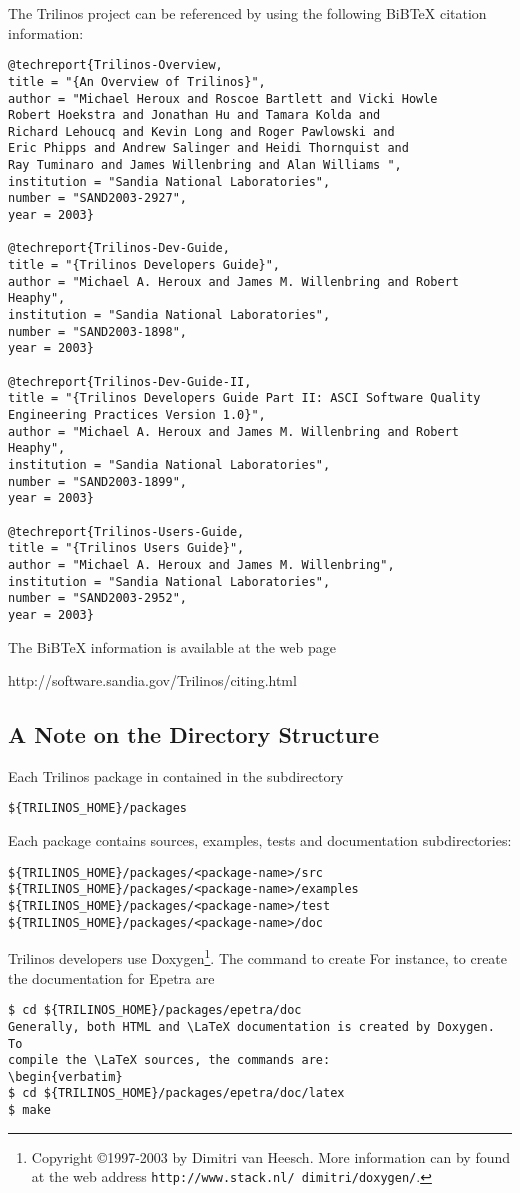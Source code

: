The Trilinos project can be referenced by using the following BiBTeX
citation information:
\begin{verbatim}
@techreport{Trilinos-Overview,
title = "{An Overview of Trilinos}",
author = "Michael Heroux and Roscoe Bartlett and Vicki Howle
Robert Hoekstra and Jonathan Hu and Tamara Kolda and
Richard Lehoucq and Kevin Long and Roger Pawlowski and
Eric Phipps and Andrew Salinger and Heidi Thornquist and
Ray Tuminaro and James Willenbring and Alan Williams ",
institution = "Sandia National Laboratories",
number = "SAND2003-2927",
year = 2003}

@techreport{Trilinos-Dev-Guide,
title = "{Trilinos Developers Guide}",
author = "Michael A. Heroux and James M. Willenbring and Robert Heaphy",
institution = "Sandia National Laboratories",
number = "SAND2003-1898",
year = 2003}

@techreport{Trilinos-Dev-Guide-II,
title = "{Trilinos Developers Guide Part II: ASCI Software Quality
Engineering Practices Version 1.0}",
author = "Michael A. Heroux and James M. Willenbring and Robert Heaphy",
institution = "Sandia National Laboratories",
number = "SAND2003-1899",
year = 2003}

@techreport{Trilinos-Users-Guide,
title = "{Trilinos Users Guide}",
author = "Michael A. Heroux and James M. Willenbring",
institution = "Sandia National Laboratories",
number = "SAND2003-2952",
year = 2003}
\end{verbatim}
The BiBTeX information is available at the web page
\begin{verb}
http://software.sandia.gov/Trilinos/citing.html
\end{verb}


\subsection{A Note on the Directory Structure}
\label{sec:into_note}

Each Trilinos package in contained in the subdirectory
\begin{verbatim}
${TRILINOS_HOME}/packages
\end{verbatim}
Each package contains sources, examples, tests and documentation subdirectories:
\begin{verbatim}
${TRILINOS_HOME}/packages/<package-name>/src
${TRILINOS_HOME}/packages/<package-name>/examples
${TRILINOS_HOME}/packages/<package-name>/test
${TRILINOS_HOME}/packages/<package-name>/doc
\end{verbatim}
Trilinos developers use Doxygen\footnote{Copyright \copyright 1997-2003
  by Dimitri van Heesch. More information can by found at the web
  address {\tt http://www.stack.nl/~dimitri/doxygen/}.}. The command
to create For instance, to create the documentation for Epetra are
\begin{verbatim}
$ cd ${TRILINOS_HOME}/packages/epetra/doc
Generally, both HTML and \LaTeX documentation is created by Doxygen. To
compile the \LaTeX sources, the commands are:
\begin{verbatim}
$ cd ${TRILINOS_HOME}/packages/epetra/doc/latex
$ make
\end{verbatim}

